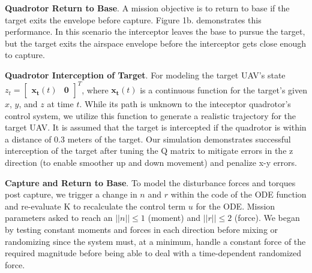 \documentclass{article}
\begin{document}
\begin{multicols}{2}
\noindent\textbf{Quadrotor Return to Base}. A mission objective is to return to base if the target exits the envelope before capture. Figure 1b. demonstrates this performance. In this scenario the interceptor leaves the base to pursue the target, but the target exits the airspace envelope before the interceptor gets close enough to capture.

\noindent\textbf{Quadrotor Interception of Target}. For modeling the target UAV's state $z_t=\begin{bmatrix}\boldsymbol{x_t}(t) & \boldsymbol{0}\end{bmatrix}^T$, where $\boldsymbol{x_t}(t)$ is a continuous function for the target's given $x$, $y$, and $z$ at time $t$. While its path is unknown to the inteceptor quadrotor's control system, we utilize this function to generate a realistic trajectory for the target UAV. It is assumed that the target is intercepted if the quadrotor is within a distance of 0.3 meters of the target. Our simulation demonstrates successful interception of the target after tuning the Q matrix to mitigate errors in the z direction (to enable smoother up and down movement) and penalize x-y errors.

\noindent\textbf{Capture and Return to Base}.  To model the disturbance forces and torques post capture, we trigger a change in $n$ and $r$ within the code of the ODE function and re-evaluate K to recalculate the control term $u$ for the ODE. Mission parameters asked to reach an $||n||\leq1$ (moment) and $||r||\leq2$ (force). We began by testing constant moments and forces in each direction before mixing or randomizing since the system must, at a minimum, handle a constant force of the required magnitude before being able to deal with a time-dependent randomized force.


\end{multicols}
\end{document}
